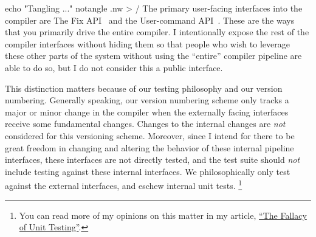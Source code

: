 \documentclass{article}%
\begin{document}
\nwenddocs{}\endmoddef\nwstartdeflinemarkup{}\nwenddeflinemarkup
echo "Tangling ..."
notangle .nw > /
\eatline
{}\nwendcode{}\nwdocspar
The primary user-facing interfaces into the compiler are 
{\Tt{}\LA{}The Fix API~{\nwtagstyle{}}\RA{}\nwendquote} and the {\Tt{}\LA{}User-command API~{\nwtagstyle{}}\RA{}\nwendquote}. 
These are the ways that you primarily drive the entire compiler.
I intentionally expose the rest of the compiler interfaces
without hiding them so that people who wish to leverage these 
other parts of the system without using the ``entire'' compiler 
pipeline are able to do so, but I do not consider this a public
interface.

This distinction matters because of our testing philosophy and our
version numbering. 
Generally speaking, our version numbering scheme only tracks a major
or minor change in the compiler when the externally facing interfaces
receive some fundamental changes.
Changes to the internal changes are \emph{not} considered for this
versioning scheme.
Moreover, since I intend for there to be great freedom in changing 
and altering the behavior of these internal pipeline interfaces,
these interfaces are not directly tested, 
and the test suite should \emph{not} include testing against these
internal interfaces.
We philosophically only test against the external interfaces,
and eschew internal unit tests.%
\footnote{You can read more of my opinions on this matter
in my article, 
\href{https://www.sacrideo.us/the-fallacy-of-unit-testing/}
{``The Fallacy of Unit Testing''}.}
\end{document}
